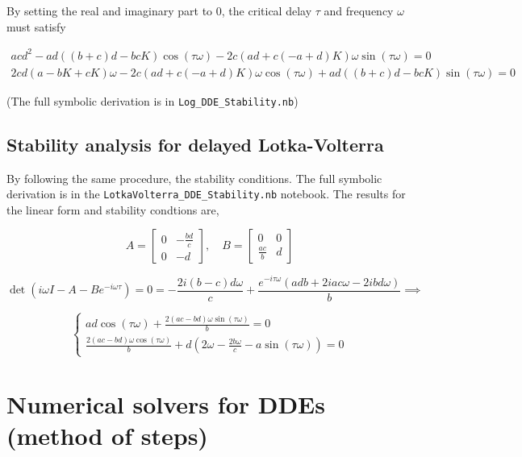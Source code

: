 \documentclass[11pt,oneside,parskip=half]{scrbook}  %
\begin{document}
By setting the real and imaginary part to 0, the critical delay $\tau$ and frequency $\omega$ must satisfy

$$
\begin{matrix}
ac d^{2} - ad\left((b+c)d-bcK\right)\cos(\tau\omega) - 2c\left(ad+c(-a+d)K\right)\omega\sin(\tau\omega) = 0
\\
2cd(a-bK+cK)\omega - 2c\left(ad+c(-a+d)K\right)\omega\cos(\tau\omega) + ad\left((b+c)d-bcK\right)\sin(\tau\omega) = 0
\end{matrix}
$$

(The full symbolic derivation is in \texttt{Log\_DDE\_Stability.nb})

\subsection{Stability analysis for delayed Lotka-Volterra}

By following the same procedure, the stability conditions. The full symbolic derivation is in the \texttt{LotkaVolterra\_DDE\_Stability.nb} notebook. The results for the linear form and stability condtions are,

$$
A = \begin{bmatrix}0&-\frac{bd}c\\0&-d\end{bmatrix},\quad B=\begin{bmatrix}0&0\\\frac{ac}b& d\end{bmatrix}
$$

$$
\det(i\omega I-A-Be^{-i\omega \tau})=0=
-\frac{2i(b-c)d\omega}c+\frac{e^{-i\tau\omega}(adb+2iac\omega-2ibd\omega)}b\implies
$$

$$
\begin{cases}
ad\cos(\tau\omega)+\frac{2(ac-bd)\omega\sin(\tau\omega)}b=0\\
\frac{2(ac-bd)\omega\cos(\tau\omega)}b+d\left(2\omega-\frac{2b\omega}c-a\sin(\tau\omega)\right)=0
\end{cases}
$$

\section{Numerical solvers for DDEs (method of steps)}
\end{document}
